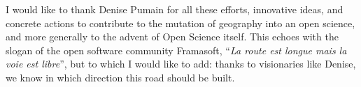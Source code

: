 \documentclass[11pt]{article}
\begin{document}
I would like to thank Denise Pumain for all these efforts, innovative ideas, and concrete actions to contribute to the mutation of geography into an open science, and more generally to the advent of Open Science itself. This echoes with the slogan of the open software community Framasoft, ``\textit{La route est longue mais la voie est libre}'', but to which I would like to add: thanks to visionaries like Denise, we know in which direction this road should be built.


\bigskip





%
\end{document}
